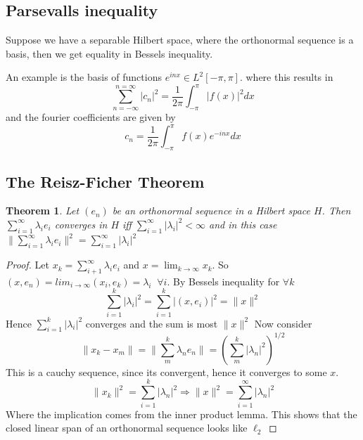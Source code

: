 \documentclass[titlepage]{article}
\newtheorem{thm}{Theorem}[section]
\begin{document}
\subsection{Parsevalls inequality}
Suppose we have a separable Hilbert space, where the orthonormal sequence is a basis, then we get equality in Bessels inequality.

An example is the  basis of functions $e^{inx} \in L^2[-\pi,\pi]$.
where this results in 
\begin{equation}
\sum_{n = -\infty}^{n = \infty} |c_n|^2 = \frac{1}{2\pi} \int_{-\pi}^{\pi}|f(x)|^2 dx
\end{equation}
and the fourier coefficients are given by
\begin{equation}
c_n = \frac{1}{2\pi}\int_{-\pi}^\pi f(x)e^{-inx} dx
\end{equation}
\subsection{The Reisz-Ficher Theorem}
\begin{thm}
Let $(e_n)$ be an orthonormal sequence in a Hilbert space $H$. Then $\sum_{i = 1}^{\infty}\lambda_ie_i $ converges in $H$ iff $\sum_{i = 1}^{\infty} |\lambda_i|^2 < \infty$ and in this case $\|\sum_{i = 1}^{\infty} \lambda_ie_i\|^2 = \sum_{i = 1}^{\infty} |\lambda_i|^2   $
\end{thm}
\begin{proof}
Let $x_k = \sum_{i+1}^\infty \lambda_i e_i$ and $x = \lim_{k \rightarrow \infty} x_k$. So $(x,e_n) = lim_{i \rightarrow \infty} (x_i,e_k) = \lambda_i \;\; \forall i$. By Bessels inequality for $\forall k$
\begin{equation}
\sum_{i = 1}^k |\lambda_i| ^2 = \sum_{i = 1}^k |(x,e_i)| ^2 = \| x \| ^2
\end{equation}
Hence $\sum_{i = 1}^k |\lambda_i| ^2$ converges and the sum is most $\|x\|^2$
Now consider
\begin{equation}
\|x_k - x_m\| = \|\sum_m^k \lambda_ne_n\| = \left(\sum_m^k |\lambda_n|^2 \right)^{1/2}
\end{equation}
 This is a cauchy sequence, since its convergent, hence it converges to some $x$. 
 \begin{equation}
 \|x_k \|^2 = \sum_{i = 1} ^k |\lambda_n |^2 \Longrightarrow \|x\|^2 = \sum_{i = 1} ^\infty |\lambda_n |^2
 \end{equation}
Where the implication comes from the inner product lemma.
This shows that the closed linear span of an orthonormal sequence looks like 
$\ell_2$
\end{proof}
\end{document}
